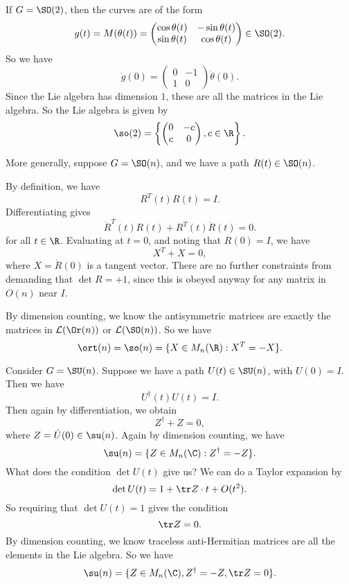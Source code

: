 \documentclass[a4paper]{article}
\begin{document}
\begin{eg}
  If $G = \SO(2)$, then the curves are of the form
  \[
    g(t) = M(\theta(t)) =
    \begin{pmatrix}
      \cos \theta(t) & -\sin \theta (t)\\
      \sin \theta(t) & \cos \theta(t)
    \end{pmatrix} \in \SO(2).
  \]
  So we have
  \[
    \dot{g}(0) =
    \begin{pmatrix}
      0 & -1\\
      1 & 0
    \end{pmatrix} \dot{\theta}(0).
  \]
  Since the Lie algebra has dimension $1$, these are all the matrices in the Lie algebra. So the Lie algebra is given by
  \[
    \so(2) = \left\{
      \begin{pmatrix}
        0 & -c\\
        c & 0
      \end{pmatrix}, c \in \R
    \right\}.
  \]
\end{eg}

\begin{eg}
  More generally, suppose $G = \SO(n)$, and we have a path $R(t) \in \SO(n)$.

  By definition, we have
  \[
    R^T(t) R(t) = I.
  \]
  Differentiating gives
  \[
    \dot{R}^T(t) R(t) + R^T(t) \dot{R}(t) = 0.
  \]
  for all $t \in \R$. Evaluating at $t = 0$, and noting that $R(0) = I$, we have
  \[
    X^T + X = 0,
  \]
  where $X = \dot{R}(0)$ is a tangent vector. There are no further constraints from demanding that $\det R = +1$, since this is obeyed anyway for any matrix in $O(n)$ near $I$.

  By dimension counting, we know the antisymmetric matrices are exactly the matrices in $\mathcal{L}(\Or(n))$ or $\mathcal{L}(\SO(n))$. So we have
  \[
    \ort(n) = \so(n) = \{X \in M_n(\R): X^T = -X\}.
  \]
\end{eg}

\begin{eg}
  Consider $G = \SU(n)$. Suppose we have a path $U(t) \in \SU(n)$, with $U(0) = I$. Then we have
  \[
    U^\dagger (t) U(t) = I.
  \]
  Then again by differentiation, we obtain
  \[
    Z^\dagger + Z = 0,
  \]
  where $Z = \dot{U}(0) \in \su(n)$. Again by dimension counting, we have
  \[
    \su(n) = \{Z \in M_n(\C): Z^\dagger = -Z\}.
  \]
  What does the condition $\det U(t)$ give us? We can do a Taylor expansion by
  \[
    \det U(t) = 1 + \tr Z \cdot t + O(t^2).
  \]
  So requiring that $\det U(t) = 1$ gives the condition
  \[
    \tr Z = 0.
  \]
  By dimension counting, we know traceless anti-Hermitian matrices are all the elements in the Lie algebra. So we have
  \[
    \su(n) = \{Z \in M_n(\C), Z^\dagger = -Z, \tr Z = 0\}.
  \]
\end{eg}
\end{document}
